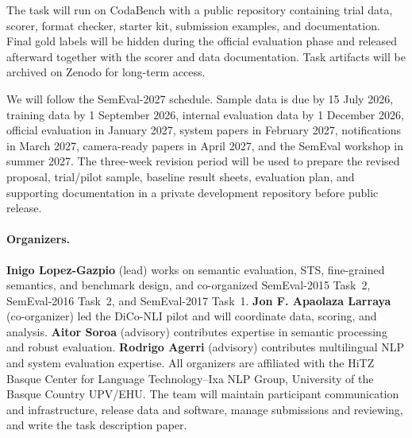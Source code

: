 \documentclass[11pt]{article}
\begin{document}
The task will run on CodaBench with a public repository containing trial data, scorer, format checker, starter kit, submission examples, and documentation.
Final gold labels will be hidden during the official evaluation phase and released afterward together with the scorer and data documentation.
Task artifacts will be archived on Zenodo for long-term access.

We will follow the SemEval-2027 schedule.
Sample data is due by 15 July 2026, training data by 1 September 2026, internal evaluation data by 1 December 2026, official evaluation in January 2027, system papers in February 2027, notifications in March 2027, camera-ready papers in April 2027, and the SemEval workshop in summer 2027.
The three-week revision period will be used to prepare the revised proposal, trial/pilot sample, baseline result sheets, evaluation plan, and supporting documentation in a private development repository before public release.

\paragraph{Organizers.}
\textbf{Inigo Lopez-Gazpio} (lead) works on semantic evaluation, STS, fine-grained semantics, and benchmark design, and co-organized SemEval-2015 Task~2, SemEval-2016 Task~2, and SemEval-2017 Task~1.
\textbf{Jon F. Apaolaza Larraya} (co-organizer) led the DiCo-NLI pilot and will coordinate data, scoring, and analysis.
\textbf{Aitor Soroa} (advisory) contributes expertise in semantic processing and robust evaluation.
\textbf{Rodrigo Agerri} (advisory) contributes multilingual NLP and system evaluation expertise.
All organizers are affiliated with the HiTZ Basque Center for Language Technology--Ixa NLP Group, University of the Basque Country UPV/EHU.
The team will maintain participant communication and infrastructure, release data and software, manage submissions and reviewing, and write the task description paper.


\end{document}
